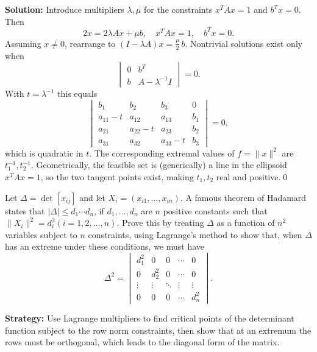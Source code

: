 \bigskip\noindent\textbf{Solution:}
Introduce multipliers $\lambda,\mu$ for the constraints $x^{\!T}Ax=1$ and $b^{\!T}x=0$. Then
\[2x=2\lambda Ax+\mu b,\quad x^{\!T}Ax=1,\quad b^{\!T}x=0.
\]
Assuming $x\neq 0$, rearrange to $(I-\lambda A)x=\tfrac{\mu}{2}\,b$. Nontrivial solutions exist only when
\[\begin{vmatrix}
0 & b^{\!T} \\
b & A-\lambda^{-1}I
\end{vmatrix}=0.
\]
With $t=\lambda^{-1}$ this equals
\[\begin{vmatrix}
b_1 & b_2 & b_3 & 0 \\
a_{11} - t & a_{12} & a_{13} & b_1 \\
a_{21} & a_{22} - t & a_{23} & b_2 \\
a_{31} & a_{32} & a_{33} - t & b_3
\end{vmatrix}=0,
\]
which is quadratic in $t$. The corresponding extremal values of $f=\|x\|^2$ are $t_1^{-1}, t_2^{-1}$. Geometrically, the feasible set is (generically) a line in the ellipsoid $x^{\!T}Ax=1$, so the two tangent points exist, making $t_1,t_2$ real and positive.\qed


\begin{problembox}
\begin{problemstatement}
Let \(\Delta = \det [x_{ij}]\) and let \(X_i = (x_{i1}, \ldots, x_{in})\). A famous theorem of Hadamard states that \(|\Delta| \leq d_1 \cdots d_n\), if \(d_1, \ldots, d_n\) are \(n\) positive constants such that \(\| X_i \|^2 = d_i^2 (i = 1, 2, \ldots, n)\). Prove this by treating \(\Delta\) as a function of \(n^2\) variables subject to \(n\) constraints, using Lagrange's method to show that, when \(\Delta\) has an extreme under these conditions, we must have
\[\Delta^2 = 
\begin{vmatrix}
d_1^2 & 0 & 0 & \cdots & 0 \\
0 & d_2^2 & 0 & \cdots & 0 \\
\vdots & \vdots & \ddots & \vdots & \vdots \\
0 & 0 & 0 & \cdots & d_n^2
\end{vmatrix}.\]
\end{problemstatement}
\end{problembox}

\noindent\textbf{Strategy:} Use Lagrange multipliers to find critical points of the determinant function subject to the row norm constraints, then show that at an extremum the rows must be orthogonal, which leads to the diagonal form of the matrix.

